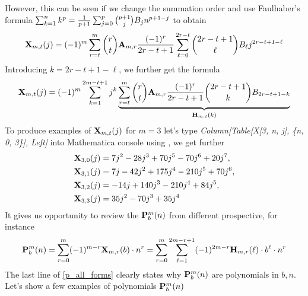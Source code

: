 \documentclass[12pt,letterpaper,oneside,reqno]{amsart}
\newcommand \bernoulli [2][B] {{#1}\sb{#2}}
\newcommand \coeffA [3][A] {{\mathbf{#1}} \sb{#2,#3}}
\newcommand \coeffH [4][H] {{\mathbf{#1}} \sb{#2,#3} (#4)}
\newcommand \polynomialX [4][X] {{\mathbf{#1}}\sb{#2,#3} (#4)}
\newcommand \polynomialP [4][P]{{\mathbf{#1}}\sp{#2} \sb{#3}(#4)}
\numberwithin{equation}{section}
\begin{document}
    However, this can be seen if we change the summation order and use Faulhaber's formula $\sum _{k=1}^{n} k^{p} =
    \frac{1}{p+1}\sum _{j=0}^{p} \binom{p+1}{j} \bernoulli{j} n^{p+1-j}$ to obtain
    \begin{equation*}
        \polynomialX{m}{t}{j} = (-1)^m \sum_{r=t}^{m} \binom{r}{t} \coeffA{m}{r} \frac{(-1)^r}{2r-t+1}
        \sum_{\ell=0}^{2r-t} \binom{2r-t+1}{\ell} \bernoulli{\ell} j^{2r-t+1-\ell}
    \end{equation*}
    Introducing $k=2r-t+1-\ell$, we further get the formula
    \begin{equation*}
        \polynomialX{m}{t}{j} = (-1)^m \sum_{k=1}^{2m-t+1} j^k
        \underbrace{\sum_{r=t}^m \binom{r}{t} \coeffA{m}{r} \frac{(-1)^r}{2r-t+1} \binom{2r-t+1}{k}
            \bernoulli{2r-t+1-k}}_{\coeffH{m}{t}{k}}
    \end{equation*}
    To produce examples of $\polynomialX{m}{t}{j}$ for $m=3$ let's type
    \textit{Column[Table[X[3, n, j], \{n, 0, 3\}], Left]} into Mathematica console using \cite{mmca_package},
    we get further
    \begin{equation*}
        \begin{split}
            \polynomialX{3}{0}{j}
            &=7 j^2 - 28 j^3 + 70 j^5 - 70 j^6 + 20 j^7, \\
            \polynomialX{3}{1}{j}
            &=7 j - 42 j^2 + 175 j^4 - 210 j^5 + 70 j^6, \\
            \polynomialX{3}{2}{j}
            &=-14 j + 140 j^3 - 210 j^4 + 84 j^5, \\
            \polynomialX{3}{3}{j}
            &=35 j^2 - 70 j^3 + 35 j^4
        \end{split}
    \end{equation*}
    It gives us opportunity to review the $\polynomialP{m}{b}{n}$ from different prospective, for instance
    \begin{equation}
        \label{p_all_forms}
        \polynomialP{m}{b}{n}
        =\sum_{r=0}^{m} (-1)^{m-r} \polynomialX{m}{r}{b} \cdot n^r
        =\sum_{r=0}^{m} \sum_{\ell=1}^{2m-r+1} (-1)^{2m-r} \coeffH{m}{r}{\ell} \cdot b^\ell \cdot n^r
    \end{equation}
    The last line of \eqref{p_all_forms} clearly states why $\polynomialP{m}{b}{n}$ are polynomials in $b,n$.
    Let's show a few examples of polynomials $\polynomialP{m}{b}{n}$
\end{document}
